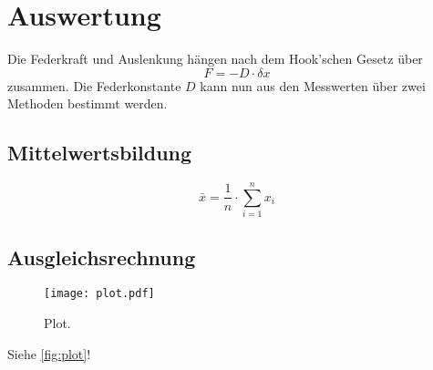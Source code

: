 \section{Auswertung}
\label{sec:Auswertung}

Die Federkraft und Auslenkung hängen nach dem Hook'schen Gesetz über
\begin{equation}
F=-D\cdot\delta x
\end{equation}
zusammen.
Die Federkonstante $D$ kann nun aus den Messwerten über zwei Methoden bestimmt werden.

\subsection{Mittelwertsbildung}

\begin{equation}
  \bar{x} = \frac{1}{n} \cdot \sum_{i=1}^{n} x_i
\end{equation}

\subsection{Ausgleichsrechnung}


\begin{figure}
  \centering
  \texttt{[image: plot.pdf]}
  \caption{Plot.}
  \label{fig:plot}
\end{figure}


Siehe \autoref{fig:plot}!
